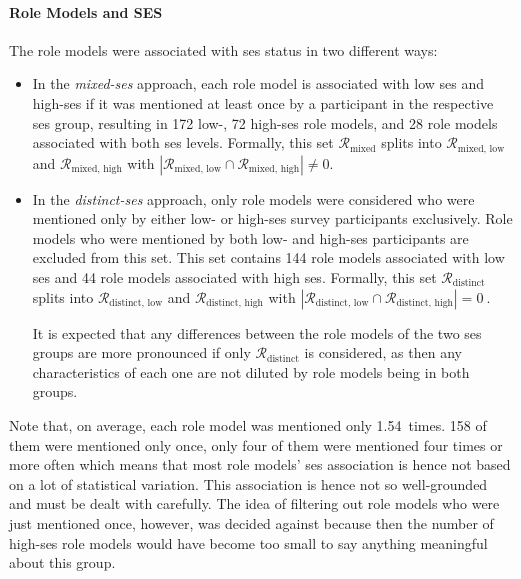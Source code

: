\paragraph{Role Models and SES}
The role models were associated with \gls{ses} status in two different ways:
\begin{itemize}
    \item In the \textit{mixed-\gls{ses}} approach, each role model is associated with low \gls{ses} and high-\gls{ses} if it was mentioned at least once by a participant in the respective \gls{ses} group, resulting in \SI{172}{} low-, \SI{72}{} high-\gls{ses} role models, and \SI{28}{} role models associated with both \gls{ses} levels. Formally, this set $\mathcal{R}_\text{mixed}$ splits into $\mathcal{R}_\text{mixed, low}$ and $\mathcal{R}_\text{mixed, high}$ with $\left|\mathcal{R}_\text{mixed, low} \cap \mathcal{R}_\text{mixed, high}\right| \neq 0$.

    \item In the \textit{distinct-\gls{ses}} approach, only role models were considered who were mentioned only by either low- or high-\gls{ses} survey participants exclusively. Role models who were mentioned by both low- and high-\gls{ses} participants are excluded from this set. This set contains \SI{144}{} role models associated with low \gls{ses} and \SI{44}{} role models associated with high \gls{ses}. Formally, this set $\mathcal{R}_\text{distinct}$ splits into $\mathcal{R}_\text{distinct, low}$ and $\mathcal{R}_\text{distinct, high}$ with $\left|\mathcal{R}_\text{distinct, low} \cap \mathcal{R}_\text{distinct, high}\right| = \SI{0}{}$.
    
    It is expected that any differences between the role models of the two \gls{ses} groups are more pronounced if only $\mathcal{R}_\text{distinct}$ is considered, as then any characteristics of each one are not diluted by role models being in both groups.
\end{itemize}

Note that, on average, each role model was mentioned only \SI{1.54}{times}. \SI{158}{} of them were mentioned only once, only four of them were mentioned four times or more often which means that most role models' \gls{ses} association is hence not based on a lot of statistical variation. This association is hence not so well-grounded and must be dealt with carefully. The idea of filtering out role models who were just mentioned once, however, was decided against because then the number of high-\gls{ses} role models would have become too small to say anything meaningful about this group.



